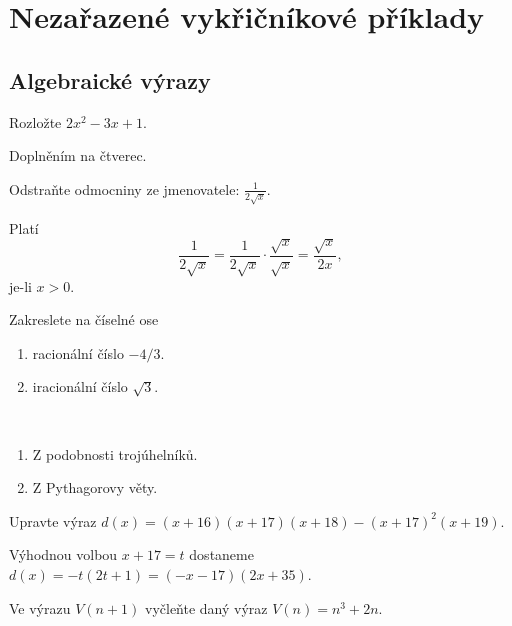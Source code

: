 \section{Nezařazené vykřičníkové příklady}
\subsection{Algebraické výrazy}
\begin{priklad}
    Rozložte $2x^2 - 3x+1.$
\end{priklad}

\begin{reseni}
Doplněním na čtverec.
\end{reseni}

\begin{priklad}
Odstraňte odmocniny ze jmenovatele: $\frac{1}{2 \sqrt{x} }.$
\end{priklad}

\begin{reseni}
Platí
$$\frac{1}{2\sqrt{x} }=\frac{1}{2\sqrt{x} }\cdot \frac{\sqrt{x} }{\sqrt{x} }=\frac{\sqrt{x} }{2x},$$
je-li $x>0.$
\end{reseni}

\begin{priklad}
    Zakreslete na číselné ose
    \begin{enumerate}[$a.$]
    \item racionální číslo $-4/3.$
   	\item iracionální číslo $\sqrt{3}. $
    \end{enumerate}
\end{priklad}

\begin{reseni}\,
\begin{enumerate}[$a.$]
\item Z podobnosti trojúhelníků.
\item Z Pythagorovy věty.
\end{enumerate}
\end{reseni}

\begin{priklad}
    Upravte výraz $d(x)=(x+16)(x+17)(x+18)-(x+17)^2(x+19).$
\end{priklad}

\begin{reseni}
 Výhodnou volbou $x+17=t$ dostaneme $d(x)=-t(2t+1)=(-x-17)(2x+35).$
\end{reseni}

\begin{priklad}
    Ve výrazu $V(n+1)$ vyčleňte daný výraz $V(n)=n^3+2n.$
\end{priklad}

